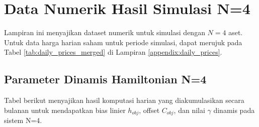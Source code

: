 \chapter{Data Numerik Hasil Simulasi N=4}
\label{appendix:numerical_data_n4}

Lampiran ini menyajikan dataset numerik untuk simulasi dengan $N=4$ aset. Untuk data harga harian saham untuk periode simulasi, dapat merujuk pada Tabel \ref{tab:daily_prices_merged} di Lampiran \ref{appendix:daily_prices}.

\section{Parameter Dinamis Hamiltonian N=4}

Tabel berikut menyajikan hasil komputasi harian yang diakumulasikan secara bulanan untuk mendapatkan bias linier $h_{obj}$, offset $C_{obj}$, dan nilai $\gamma$ dinamis pada sistem N=4.

